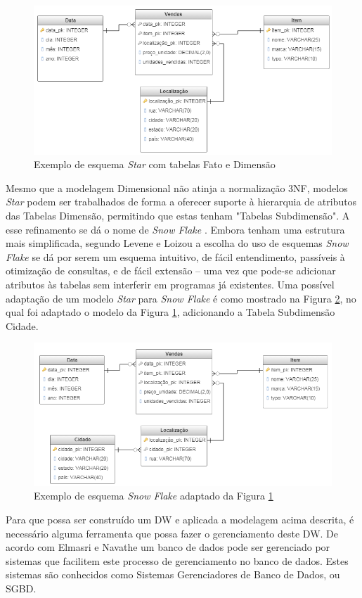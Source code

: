 \begin{figure}[htpb]
	\centering
		\includegraphics[width=13cm]{img/star_dim}
	\caption{Exemplo de esquema \textit{Star} com tabelas Fato e Dimensão}
	\label{fig:star_dim}
\end{figure}

Mesmo que a modelagem Dimensional não atinja a normalização 3NF, modelos \textit{Star} podem ser trabalhados de forma a oferecer suporte à hierarquia de atributos das Tabelas Dimensão, permitindo que estas tenham "Tabelas Subdimensão". A esse refinamento se dá o nome de \textit{Snow Flake} \cite{navathe2011banco}. Embora tenham uma estrutura mais simplificada, segundo Levene e Loizou \cite{levene2003snowflake} a escolha do uso de esquemas \textit{Snow Flake} se dá por serem um esquema intuitivo, de fácil entendimento, passíveis à otimização de consultas, e de fácil extensão -- uma vez que pode-se adicionar atributos às tabelas sem interferir em programas já existentes. Uma possível adaptação de um modelo \textit{Star} para \textit{Snow Flake} é como mostrado na Figura \ref{fig:snow}, no qual foi adaptado o modelo da Figura \ref{fig:star_dim}, adicionando a Tabela Subdimensão Cidade. 

\begin{figure}[htpb]
	\centering
		\includegraphics[width=13cm]{img/snow}
	\caption{Exemplo de esquema \textit{Snow Flake} adaptado da Figura \ref{fig:star_dim}}
	\label{fig:snow}
\end{figure}

Para que possa ser construído um DW e aplicada a modelagem acima descrita, 
é necessário alguma ferramenta que possa fazer o gerenciamento deste DW. 
De acordo com Elmasri e Navathe \cite{navathe2011banco} um banco de dados pode ser gerenciado por sistemas que 
facilitem este processo de gerenciamento no banco de dados. Estes sistemas são conhecidos como Sistemas Gerenciadores de Banco de Dados, ou SGBD.